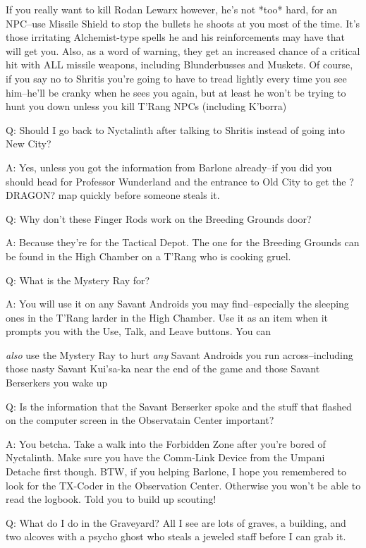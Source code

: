 \documentclass[12pt]{article}
\begin{document}
If you really want to kill Rodan Lewarx however, he's not *too* hard, for
an NPC--use Missile Shield to stop the bullets he shoots at you most of
the time.  It's those irritating Alchemist-type spells he and his
reinforcements may have that will get you.  Also, as a word of warning,
they get an increased chance of a critical hit with ALL missile weapons,
including Blunderbusses and Muskets.  Of course, if you say no to Shritis
you're going to have to tread lightly every time you see him--he'll be
cranky when he sees you again, but at least he won't be trying to hunt you
down unless you kill T'Rang NPCs (including K'borra)

Q: Should I go back to Nyctalinth after talking to Shritis instead of
going into New City?

A: Yes, unless you got the information from Barlone already--if you did
you should head for Professor Wunderland and the entrance to Old City to
get the ?DRAGON? map quickly before someone steals it.

Q: Why don't these Finger Rods work on the Breeding Grounds door?

A: Because they're for the Tactical Depot. The one for the Breeding
Grounds can be found in the High Chamber on a T'Rang who is cooking
gruel.

Q: What is the Mystery Ray for?

A: You will use it on any Savant Androids you may find--especially the
sleeping ones in the T'Rang larder in the High Chamber. Use it as an
item when it prompts you with the Use, Talk, and Leave buttons. You can

\emph{also} use the Mystery Ray to hurt \emph{any} Savant Androids you run
across--including those nasty Savant Kui'sa-ka near the end of the game
and those Savant Berserkers you wake up

Q: Is the information that the Savant Berserker spoke and the stuff that
flashed on the computer screen in the Observatain Center important?

A: You betcha. Take a walk into the Forbidden Zone after you're bored of
Nyctalinth. Make sure you have the Comm-Link Device from the Umpani
Detache first though. BTW, if you helping Barlone, I hope you remembered
to look for the TX-Coder in the Observation Center. Otherwise you won't
be able to read the logbook. Told you to build up scouting!

Q: What do I do in the Graveyard? All I see are lots of graves, a
building, and two alcoves with a psycho ghost who steals a jeweled staff
before I can grab it.
\end{document}
